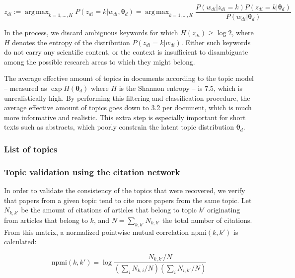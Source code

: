 \documentclass{article}
\DeclareMathOperator*{\argmax}{arg\,max}
\begin{document}
\begin{equation}
    z_{di} := \argmax_{k=1,\dots,K} P(z_{di}=k|w_{di},\bm{\theta}_{d}) =  \argmax_{k=1,\dots,K} \dfrac{P(w_{di}|z_{di}=k)P(z_{di}=k|\bm{\theta}_d)}{P(w_{di}|\bm{\theta}_d)}
\end{equation}

In the process, we discard ambiguous keywords for which $H(z_{di})\geq \log{2}$, where $H$ denotes the entropy of the distribution $P(z_{di}=k|w_{di})$. Either such keywords do not carry any scientific content, or the context is insufficient to disambiguate among the possible research areas to which they might belong.

The average effective amount of topics in documents according to the topic model -- measured as $\exp H(\bm{\theta}_{d})$ where $H$ is the Shannon entropy -- is 7.5, which is unrealistically high. By performing this filtering and classification procedure, the average effective amount of topics goes down to 3.2 per document, which is much more informative and realistic. This extra step is especially important for short texts such as abstracts, which poorly constrain the latent topic distribution $\bm{\theta}_{d}$.

\subsubsection{List of topics}

\fontsize{6}{7}\selectfont\normalsize

\subsubsection{\label{appendix:citation_validation}Topic validation using the citation network}

In order to validate the consistency of the topics that were recovered, we verify that papers from a given topic tend to cite more papers from the same topic. Let $N_{k,k'}$ be the amount of citations of articles that belong to topic $k'$ originating from articles that belong to $k$, and $N=\sum_{k,k'}N_{k,k'}$ the total number of citations. From this matrix, a normalized pointwise mutual correlation $\mathrm{npmi}(k,k')$ is calculated:

\begin{equation}
    \mathrm{npmi}(k,k') = \log {\dfrac{N_{k,k'}/N}{(\sum_{i} N_{k,i}/N)(\sum_{i} N_{i,k'}/N)}}
\end{equation}
\end{document}
